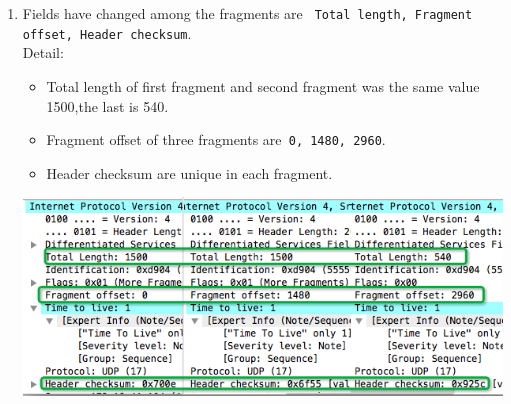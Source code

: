 \documentclass[a4paper]{article}
\begin{document}
{\begin{enumerate}
	\item Fields have changed among the fragments are \verb| Total length, Fragment offset, Header checksum|.\\
	  Detail:
	  \begin{itemize}
		  \item Total length of first fragment and second fragment was the same value 1500,the last is 540.
		  \item Fragment offset of three fragments are\verb| 0, 1480, 2960|.
		  \item Header checksum are unique in each fragment.
	 \end{itemize}
	\begin{center} \includegraphics[scale=0.5]{Illustrations/9.png} \end{center}
	\end{enumerate}
}
\end{document}
